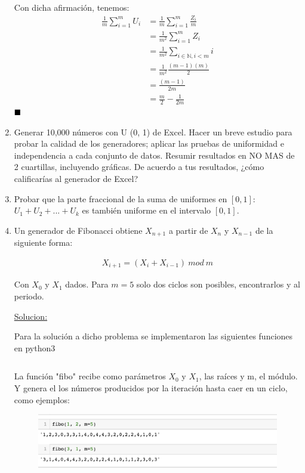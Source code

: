 \documentclass[12 pt]{article}
\renewcommand\qedsymbol{$\null\hfill\blacksquare$}
\begin{document}
\begin{enumerate}
    Con dicha afirmación, tenemos: 
    \begin{align*}
        \frac{1}{m}\sum_{i=1}^{m} U_i &= \frac{1}{m}\sum_{i=1}^{m} \frac{Z_i}{m} \\
        &= \frac{1}{m^2}\sum_{i=1}^{m}  Z_i  \\
        &= \frac{1}{m^2}\sum_{i\in\mathbb{N}, i<m} i \\
        &= \frac{1}{m^2} \frac{(m-1)(m)}{2} \\
        &= \frac{(m-1)}{2m} \\
        &= \frac{m}{2} - \frac{1}{2m}
    \end{align*}
    \qedsymbol
    
    \newpage
    
    \item Generar 10,000 números con U (0, 1) de Excel. Hacer un breve estudio para probar la calidad de los generadores; aplicar las pruebas de uniformidad e independencia a cada conjunto de datos. Resumir resultados en NO MAS de 2 cuartillas, incluyendo gráficas. De acuerdo a tus resultados, ¿cómo calificarías al generador de Excel?
    
    \newpage
    \item Probar que la parte fraccional de la suma de uniformes en $[0,1]$: $U_1 + U_2 + ... + U_k$ es también uniforme en el intervalo $[0,1]$.
    
    \newpage
    \item Un generador de Fibonacci obtiene $X_{n+1}$ a partir de $X_n$ y $X_{n−1}$ de la siguiente forma:
    
    \begin{align*}
        X_{i+1} = (X_i + X_{i-1}) \ mod \ m
    \end{align*}
    
    Con $X_0$ y $X_1$ dados. Para $m=5$ solo dos ciclos son posibles, encontrarlos y al periodo.
    
    \underline{Solucion:}
    
    Para la solución a dicho problema se implementaron las siguientes funciones en python3
    
    \inputminted[fontsize=\scriptsize]{python}{fibonacci_generator.py}
    
    La función "fibo" recibe como parámetros $X_0$ y $X_1$, las raíces y m, el módulo. Y genera el los números producidos por la iteración hasta caer en un ciclo, como ejemplos:
    
    \begin{figure}[h]
        \centering
        \includegraphics[width=11cm]{fibonacci.png}
    \end{figure}
    

\end{enumerate}
\end{document}
